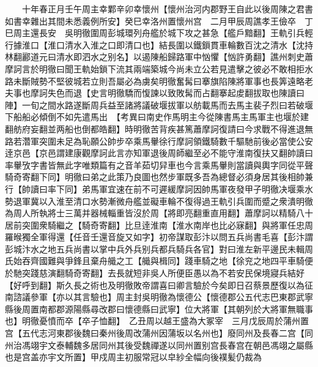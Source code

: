 　　十年春正月壬午周主幸鄴辛卯幸懷州【懷州治河内郡野王自此以後周陳之君書如書幸雜出其間未悉義例所安】癸巳幸洛州置懷州宫　二月甲辰周譙孝王儉卒　丁巳周主還長安　吳明徹圍周彭城環列舟艦於城下攻之甚急【艦戶黯翻】王軌引兵輕行據淮口【淮口清水入淮之口即清口也】結長圍以鐵鎻貫車輪數百沈之清水【沈持林翻酈道元曰清水即泗水之别名】以遏陳船歸路軍中忷懼【忷許勇翻】譙州刺史蕭摩訶言於明徹曰聞王軌始鎖下流其兩端築城今尚未立公若見遣擊之彼必不敢相拒水路未斷賊勢不堅彼城若立則吾屬必為虜矣明徹奮髯曰搴旗陷陳將軍事也長筭遠略老夫事也摩訶失色而退【史言明徹驕而愎諫以致敗髯而占翻搴起䖍翻拔取也陳讀曰陣】一旬之間水路遂斷周兵益至諸將議破堰拔軍以舫載馬而去馬主裴子烈曰若破堰下船船必傾倒不如先遣馬出　【考異曰南史作馬明主今從陳書馬主馬軍主也堰於建翻舫府妄翻並两船也倒都皓翻】時明徹苦背疾甚篤蕭摩訶復請曰今求戰不得進退無路若濳軍突圍未足為恥願公帥步卒乘馬轝徐行摩訶領鐵騎數千驅馳前後必當使公安逹京邑【京邑謂建康觀摩訶此言亦知軍退後周師繼至必不能守淮南復扶又翻帥讀曰率轝攷字書皆無此字唯類篇有之音羊茹切舁車也今言乘馬轝則當讀與輿字同從平聲騎奇寄翻下同】明徹曰弟之此策乃良圖也然步軍既多吾為總督必須身居其後相帥兼行【帥讀曰率下同】弟馬軍宜速在前不可遲緩摩訶因帥馬軍夜發甲子明徹决堰乘水勢退軍冀以入淮至清口水勢漸微舟艦並礙車輪不復得過王軌引兵圍而蹙之衆潰明徹為周人所執將士三萬并器械輜重皆沒於周【將即亮翻重直用翻】蕭摩訶以精騎八十居前突圍衆騎繼之【騎奇寄翻】比旦逹淮南【淮水南岸也比必寐翻】與將軍任忠周羅㬋獨全軍得還【任音壬還音旋又如字】初帝謀取彭汴以問五兵尚書毛喜【彭汴謂彭城汴水之地五兵尚書以掌中兵外兵别兵都兵騎兵各官】對曰淮左新平邊民未輯周氏始吞齊國難與爭鋒且棄舟艥之工【艥與楫同】踐車騎之地【徐兖之地四平車騎便於馳突踐慈演翻騎奇寄翻】去長就短非吳人所便臣愚以為不若安民保境寢兵結好【好呼到翻】斯久長之術也及明徹敗帝謂喜曰卿言驗於今矣即日召蔡景歷復以為征南諮議參軍【亦以其言驗也】周主封吳明徹為懷德公【懷德郡公五代志巴東郡武寧縣後周置南都郡源陽縣尋改郡曰懷德縣曰武寧】位大將軍【其朝列於大將軍無職事也】明徹憂憤而卒【卒子恤翻】　乙丑周以越王盛為大冢宰　三月戊辰周於蒲州置宫【五代志河東郡後魏曰秦州後周改蒲州因蒲坂以名州也】廢同州及長春二宫【同州治馮翊宇文泰輔魏多居同州其後受魏禪遂以同州置别宫長春宫在朝邑馮翊之屬縣也是宫盖亦宇文所置】甲戍周主初服常冠以皁紗全幅向後襆髪仍裁為

